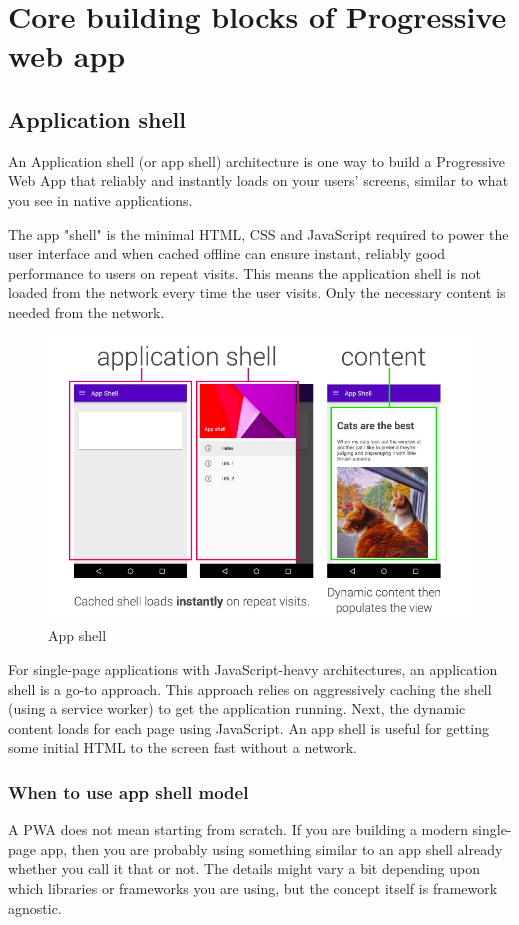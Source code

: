 \documentclass[14pt,a4paper,final]{extreport}
\begin{document}
\chapter{Core building blocks of Progressive web app}
\section{Application shell}
\item An Application shell (or app shell) architecture is one way to build a Progressive Web App that reliably and instantly loads on your users' screens, similar to what you see in native applications.


The app "shell" is the minimal HTML, CSS and JavaScript required to power the user interface and when cached offline can ensure instant, reliably good performance to users on repeat visits. This means the application shell is not loaded from the network every time the user visits. Only the necessary content is needed from the network.
\begin{figure}[h!]
		\includegraphics[scale=.56]{apshell.jpeg}
    \caption{App shell}
\end{figure}
\newline
\newline
For single-page applications with JavaScript-heavy architectures, an application shell is a go-to approach. This approach relies on aggressively caching the shell (using a service worker) to get the application running. Next, the dynamic content loads for each page using JavaScript. An app shell is useful for getting some initial HTML to the screen fast without a network.

\subsection{When to use app shell model}
\itemBuilding A PWA does not mean starting from scratch. If you are building a modern single-page app, then you are probably using something similar to an app shell already whether you call it that or not. The details might vary a bit depending upon which libraries or frameworks you are using, but the concept itself is framework agnostic.
\end{document}
